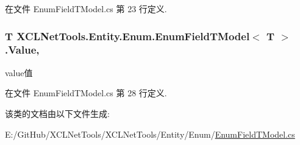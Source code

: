 在文件 Enum\+Field\+T\+Model.\+cs 第 23 行定义.

\subsubsection[{\texorpdfstring{Value}{Value}}]{\setlength{\rightskip}{0pt plus 5cm}T {\bf X\+C\+L\+Net\+Tools.\+Entity.\+Enum.\+Enum\+Field\+T\+Model}$<$ T $>$.Value\hspace{0.3cm}{\ttfamily [get]}, {\ttfamily [set]}}\hypertarget{class_x_c_l_net_tools_1_1_entity_1_1_enum_1_1_enum_field_t_model_a0b6e9efa5eb3b809fdc2bbb675a4e8e3}{}\label{class_x_c_l_net_tools_1_1_entity_1_1_enum_1_1_enum_field_t_model_a0b6e9efa5eb3b809fdc2bbb675a4e8e3}


value值 



在文件 Enum\+Field\+T\+Model.\+cs 第 28 行定义.



该类的文档由以下文件生成\+:\begin{DoxyCompactItemize}
\item 
E\+:/\+Git\+Hub/\+X\+C\+L\+Net\+Tools/\+X\+C\+L\+Net\+Tools/\+Entity/\+Enum/\hyperlink{_enum_field_t_model_8cs}{Enum\+Field\+T\+Model.\+cs}\end{DoxyCompactItemize}
